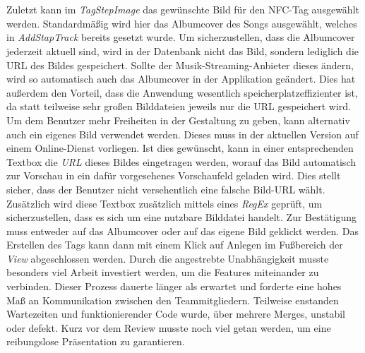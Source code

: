 \documentclass[10pt, a4paper]{article}
\begin{document}
\begin{onehalfspace}
\\~\\
Zuletzt kann im \textit{TagStepImage} das gewünschte Bild für den NFC-Tag ausgewählt werden.
Standardmäßig wird hier das Albumcover des Songs ausgewählt, welches in \textit{AddStapTrack} bereits gesetzt wurde.
Um sicherzustellen, dass die Albumcover jederzeit aktuell sind, wird in der Datenbank nicht das Bild, sondern lediglich die URL des Bildes gespeichert.
Sollte der Musik-Streaming-Anbieter dieses ändern, wird so automatisch auch das Albumcover in der Applikation geändert.
Dies hat außerdem den Vorteil, dass die Anwendung wesentlich speicherplatzeffizienter ist, da statt teilweise sehr großen Bilddateien jeweils nur die URL gespeichert wird.
Um dem Benutzer mehr Freiheiten in der Gestaltung zu geben, kann alternativ auch ein eigenes Bild verwendet werden.
Dieses muss in der aktuellen Version auf einem Online-Dienst vorliegen.
Ist dies gewünscht, kann in einer entsprechenden Textbox die \textit{URL} dieses Bildes eingetragen werden, worauf das Bild automatisch zur Vorschau in ein dafür vorgesehenes Vorschaufeld geladen wird.
Dies stellt sicher, dass der Benutzer nicht versehentlich eine falsche Bild-URL wählt.
Zusätzlich wird diese Textbox zusätzlich mittels eines \textit{RegEx} geprüft, um sicherzustellen, dass es sich um eine nutzbare Bilddatei handelt.
Zur Bestätigung muss entweder auf das Albumcover oder auf das eigene Bild geklickt werden.
Das Erstellen des Tags kann dann mit einem Klick auf \glqq Anlegen\grqq{} im Fußbereich der \textit{View} abgeschlossen werden.
Durch die angestrebte Unabhängigkeit musste besonders viel Arbeit investiert werden, um die Features miteinander zu verbinden.
Dieser Prozess dauerte länger als erwartet und forderte eine hohes Maß an Kommunikation zwischen den Teammitgliedern.
Teilweise enstanden Wartezeiten und funktionierender Code wurde, über mehrere Merges, unstabil oder defekt.
Kurz vor dem Review musste noch viel getan werden, um eine reibungslose Präsentation zu garantieren.


\end{onehalfspace}
\end{document}
